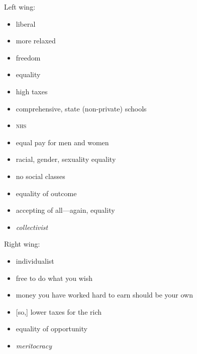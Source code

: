 \documentclass[a4paper,12pt]{article}
\begin{document}
Left wing:

\begin{itemize}

\item{liberal}
\item{more relaxed}
\item{freedom}
\item{equality}
\item{high taxes}
\item{comprehensive, state (non-private) schools}
\item{\textsc{nhs}}
\item{equal pay for men and women}
\item{racial, gender, sexuality equality}
\item{no social classes}
\item{equality of outcome}
\item{accepting of all---again, equality}
\item{\textsl{collectivist}}

\end{itemize}

Right wing:

\begin{itemize}

\item{individualist}
\item{free to do what you wish}
\item{money you have worked hard to earn should be your own}
\item{[so,] lower taxes for the rich}
\item{equality of opportunity}
\item{\textsl{meritocracy}}

\end{itemize}
\end{document}
